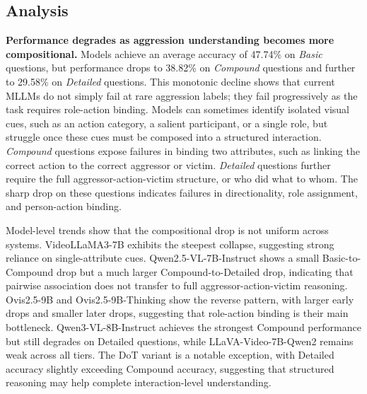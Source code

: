 \subsection{Analysis}
\textbf{Performance degrades as aggression understanding becomes more compositional.}
Models achieve an average accuracy of 47.74\% on \textit{Basic} questions, but performance drops to 38.82\% on \textit{Compound} questions and further to 29.58\% on \textit{Detailed} questions. This monotonic decline shows that current MLLMs do not simply fail at rare aggression labels; they fail progressively as the task requires role-action binding. Models can sometimes identify isolated visual cues, such as an action category, a salient participant, or a single role, but struggle once these cues must be composed into a structured interaction. \textit{Compound} questions expose failures in binding two attributes, such as linking the correct action to the correct aggressor or victim. \textit{Detailed} questions further require the full aggressor-action-victim structure, or who did what to whom. The sharp drop on these questions indicates failures in directionality, role assignment, and person-action binding.

Model-level trends show that the compositional drop is not uniform across systems. VideoLLaMA3-7B exhibits the steepest collapse, suggesting strong reliance on single-attribute cues. Qwen2.5-VL-7B-Instruct shows a small Basic-to-Compound drop but a much larger Compound-to-Detailed drop, indicating that pairwise association does not transfer to full aggressor-action-victim reasoning. Ovis2.5-9B and Ovis2.5-9B-Thinking show the reverse pattern, with larger early drops and smaller later drops, suggesting that role-action binding is their main bottleneck. Qwen3-VL-8B-Instruct achieves the strongest Compound performance but still degrades on Detailed questions, while LLaVA-Video-7B-Qwen2 remains weak across all tiers. The DoT variant is a notable exception, with Detailed accuracy slightly exceeding Compound accuracy, suggesting that structured reasoning may help complete interaction-level understanding.


